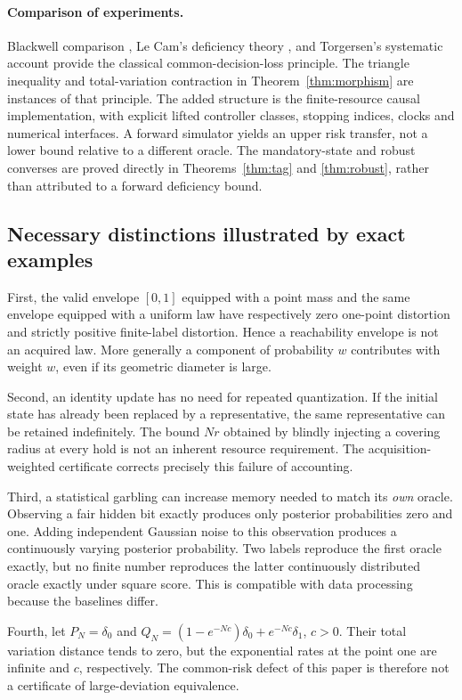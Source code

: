 \paragraph{Comparison of experiments.}
Blackwell comparison \cite{blackwell}, Le Cam's deficiency theory \cite{lecam}, and Torgersen's systematic account \cite{torgersen} provide the classical common-decision-loss principle. The triangle inequality and total-variation contraction in Theorem~\ref{thm:morphism} are instances of that principle. The added structure is the finite-resource causal implementation, with explicit lifted controller classes, stopping indices, clocks and numerical interfaces. A forward simulator yields an upper risk transfer, not a lower bound relative to a different oracle. The mandatory-state and robust converses are proved directly in Theorems~\ref{thm:tag} and \ref{thm:robust}, rather than attributed to a forward deficiency bound.

\subsection{Necessary distinctions illustrated by exact examples}
First, the valid envelope $[0,1]$ equipped with a point mass and the same envelope equipped with a uniform law have respectively zero one-point distortion and strictly positive finite-label distortion. Hence a reachability envelope is not an acquired law. More generally a component of probability $w$ contributes with weight $w$, even if its geometric diameter is large.

Second, an identity update has no need for repeated quantization. If the initial state has already been replaced by a representative, the same representative can be retained indefinitely. The bound $Nr$ obtained by blindly injecting a covering radius at every hold is not an inherent resource requirement. The acquisition-weighted certificate corrects precisely this failure of accounting.

Third, a statistical garbling can increase memory needed to match its \emph{own} oracle. Observing a fair hidden bit exactly produces only posterior probabilities zero and one. Adding independent Gaussian noise to this observation produces a continuously varying posterior probability. Two labels reproduce the first oracle exactly, but no finite number reproduces the latter continuously distributed oracle exactly under square score. This is compatible with data processing because the baselines differ.

Fourth, let $P_N=\delta_0$ and $Q_N=(1-e^{-Nc})\delta_0+e^{-Nc}\delta_1$, $c>0$. Their total variation distance tends to zero, but the exponential rates at the point one are infinite and $c$, respectively. The common-risk defect of this paper is therefore not a certificate of large-deviation equivalence.

